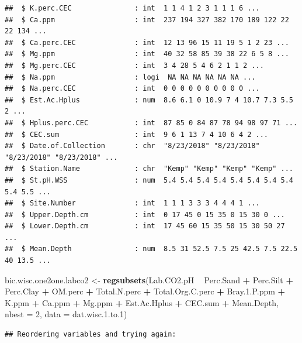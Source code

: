 \documentclass[]{article}
\newenvironment{Shaded}{\begin{snugshade}}{\end{snugshade}}
\newcommand{\DataTypeTok}[1]{\textcolor[rgb]{0.13,0.29,0.53}{#1}}
\newcommand{\DecValTok}[1]{\textcolor[rgb]{0.00,0.00,0.81}{#1}}
\newcommand{\FloatTok}[1]{\textcolor[rgb]{0.00,0.00,0.81}{#1}}
\newcommand{\KeywordTok}[1]{\textcolor[rgb]{0.13,0.29,0.53}{\textbf{#1}}}
\newcommand{\NormalTok}[1]{#1}
\newcommand{\OperatorTok}[1]{\textcolor[rgb]{0.81,0.36,0.00}{\textbf{#1}}}
\newcommand{\StringTok}[1]{\textcolor[rgb]{0.31,0.60,0.02}{#1}}
\begin{document}
\begin{verbatim}
##  $ K.perc.CEC               : int  1 1 4 1 2 3 1 1 1 6 ...
##  $ Ca.ppm                   : int  237 194 327 382 170 189 122 22 22 134 ...
##  $ Ca.perc.CEC              : int  12 13 96 15 11 19 5 1 2 23 ...
##  $ Mg.ppm                   : int  40 32 58 85 39 38 22 6 5 8 ...
##  $ Mg.perc.CEC              : int  3 4 28 5 4 6 2 1 1 2 ...
##  $ Na.ppm                   : logi  NA NA NA NA NA NA ...
##  $ Na.perc.CEC              : int  0 0 0 0 0 0 0 0 0 0 ...
##  $ Est.Ac.Hplus             : num  8.6 6.1 0 10.9 7 4 10.7 7.3 5.5 2 ...
##  $ Hplus.perc.CEC           : int  87 85 0 84 87 78 94 98 97 71 ...
##  $ CEC.sum                  : int  9 6 1 13 7 4 10 6 4 2 ...
##  $ Date.of.Collection       : chr  "8/23/2018" "8/23/2018" "8/23/2018" "8/23/2018" ...
##  $ Station.Name             : chr  "Kemp" "Kemp" "Kemp" "Kemp" ...
##  $ St.pH.WSS                : num  5.4 5.4 5.4 5.4 5.4 5.4 5.4 5.4 5.4 5.5 ...
##  $ Site.Number              : int  1 1 1 3 3 3 4 4 4 1 ...
##  $ Upper.Depth.cm           : int  0 17 45 0 15 35 0 15 30 0 ...
##  $ Lower.Depth.cm           : int  17 45 60 15 35 50 15 30 50 27 ...
##  $ Mean.Depth               : num  8.5 31 52.5 7.5 25 42.5 7.5 22.5 40 13.5 ...
\end{verbatim}

\begin{Shaded}
\begin{Highlighting}[]
\NormalTok{bic.wisc.one2one.labco2 <-}\StringTok{ }\KeywordTok{regsubsets}\NormalTok{(Lab.CO2.pH }\OperatorTok{~}\StringTok{ }\NormalTok{Perc.Sand }\OperatorTok{+}\StringTok{ }\NormalTok{Perc.Silt }\OperatorTok{+}\StringTok{ }\NormalTok{Perc.Clay }\OperatorTok{+}\StringTok{ }\NormalTok{OM.perc }\OperatorTok{+}\StringTok{ }\NormalTok{Total.N.perc }\OperatorTok{+}\StringTok{ }\NormalTok{Total.Org.C.perc }\OperatorTok{+}\StringTok{ }\NormalTok{Bray.}\FloatTok{1.}\NormalTok{P.ppm }\OperatorTok{+}\StringTok{ }\NormalTok{K.ppm }\OperatorTok{+}\StringTok{ }\NormalTok{Ca.ppm }\OperatorTok{+}\StringTok{ }\NormalTok{Mg.ppm }\OperatorTok{+}\StringTok{ }\NormalTok{Est.Ac.Hplus }\OperatorTok{+}\StringTok{ }\NormalTok{CEC.sum }\OperatorTok{+}\StringTok{ }\NormalTok{Mean.Depth, }\DataTypeTok{nbest =} \DecValTok{2}\NormalTok{, }\DataTypeTok{data =}\NormalTok{ dat.wisc.}\FloatTok{1.}\NormalTok{to}\FloatTok{.1}\NormalTok{)}
\end{Highlighting}
\end{Shaded}

\begin{verbatim}
## Reordering variables and trying again:
\end{verbatim}
\end{document}
